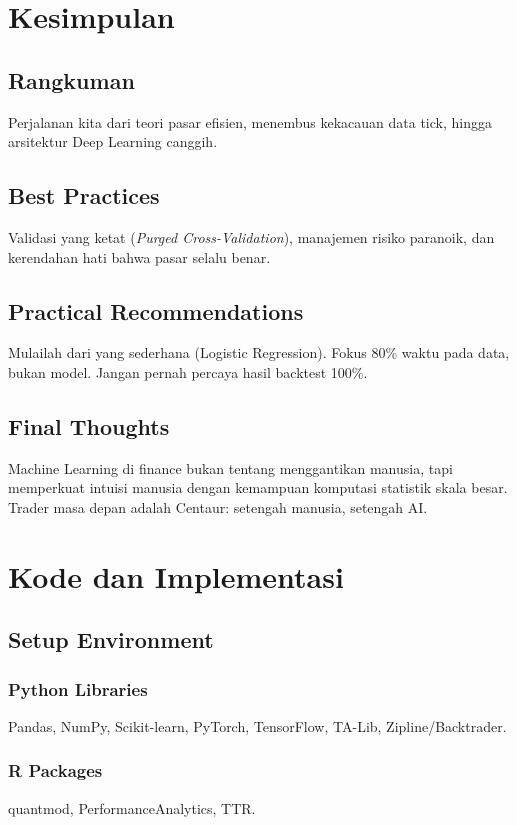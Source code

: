 \documentclass[12pt,a4paper]{book}
\begin{document}
\chapter{Kesimpulan}
\section{Rangkuman}
Perjalanan kita dari teori pasar efisien, menembus kekacauan data tick, hingga arsitektur Deep Learning canggih.

\section{Best Practices}
Validasi yang ketat (\textit{Purged Cross-Validation}), manajemen risiko paranoik, dan kerendahan hati bahwa pasar selalu benar.

\section{Practical Recommendations}
Mulailah dari yang sederhana (Logistic Regression). Fokus 80\% waktu pada data, bukan model. Jangan pernah percaya hasil backtest 100\%.

\section{Final Thoughts}
Machine Learning di finance bukan tentang menggantikan manusia, tapi memperkuat intuisi manusia dengan kemampuan komputasi statistik skala besar. Trader masa depan adalah Centaur: setengah manusia, setengah AI.

\appendix

\chapter{Kode dan Implementasi}
\section{Setup Environment}
\subsection{Python Libraries}
Pandas, NumPy, Scikit-learn, PyTorch, TensorFlow, TA-Lib, Zipline/Backtrader.

\subsection{R Packages}
quantmod, PerformanceAnalytics, TTR.
\end{document}
